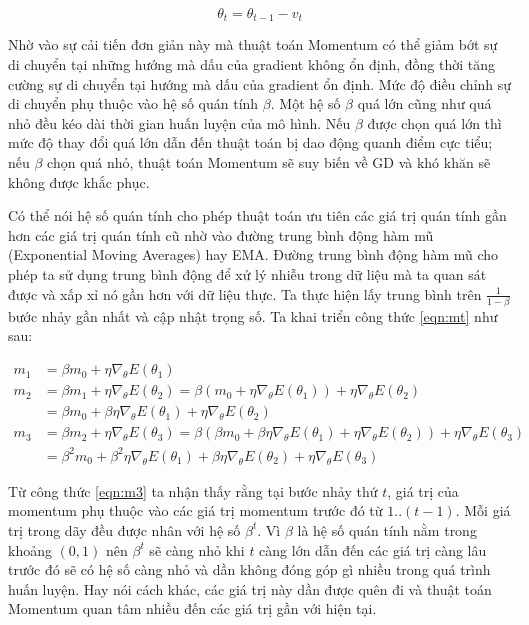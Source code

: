 \begin{equation}
	\label{eqn:theta-momentum}
	\theta_t = \theta_{t-1} - v_t
\end{equation}

Nhờ vào sự cải tiến đơn giản này mà thuật toán Momentum có thể giảm bớt sự di chuyển tại những hướng mà dấu của gradient không ổn định, đồng thời tăng cường sự di chuyển tại hướng mà dấu của gradient ổn định. Mức độ điều chỉnh sự di chuyển phụ thuộc vào hệ số quán tính $\beta$. Một hệ số $\beta$ quá lớn cũng như quá nhỏ đều kéo dài thời gian huấn luyện của mô hình. Nếu $\beta$ được chọn quá lớn thì mức độ thay đổi quá lớn dẫn đến thuật toán bị dao động quanh điểm cực tiểu; nếu $\beta$ chọn quá nhỏ, thuật toán Momentum sẽ suy biến về GD và khó khăn sẽ không được khắc phục.

Có thể nói hệ số quán tính cho phép thuật toán ưu tiên các giá trị quán tính gần hơn các giá trị quán tính cũ nhờ vào đường trung bình động hàm mũ (Exponential Moving Averages) hay EMA. Đường trung bình động hàm mũ cho phép ta sử dụng trung bình động để xử lý nhiễu trong dữ liệu mà ta quan sát được và xấp xỉ nó gần hơn với dữ liệu thực. Ta thực hiện lấy trung bình trên $\frac{1}{1-\beta}$ bước nhảy gần nhất và cập nhật trọng số. Ta khai triển công thức \ref{eqn:mt} như sau:

\begin{equation}
	\label{eqn:m3}
	\begin{aligned}
		m_1 &= \beta m_0 + \eta\nabla_\theta E(\theta_1) \\ m_2 &= \beta m_1 + \eta \nabla_\theta E(\theta_2) = \beta (m_0 + \eta\nabla_\theta E(\theta_1)) + \eta\nabla_\theta E(\theta_2) \\ &= \beta m_0 + \beta\eta\nabla_\theta E(\theta_1) + \eta\nabla_\theta E(\theta_2) \\ m_3 &= \beta m_2 + \eta\nabla_\theta E(\theta_3) = \beta (\beta m_0 + \beta\eta\nabla_\theta E(\theta_1) + \eta\nabla_\theta E(\theta_2)) + \eta\nabla_\theta E(\theta_3) \\ &= \beta^2 m_0 + \beta^2\eta \nabla_\theta E(\theta_1) + \beta \eta \nabla_\theta E(\theta_2) +\eta \nabla_\theta E(\theta_3)
	\end{aligned}
\end{equation}

Từ công thức \ref{eqn:m3} ta nhận thấy rằng tại bước nhảy thứ $t$, giá trị của momentum phụ thuộc vào các giá trị momentum trước đó từ $1..(t-1)$. Mỗi giá trị trong dãy đều được nhân với hệ số $\beta ^t$. Vì $\beta$ là hệ số quán tính nằm trong khoảng $(0,1)$ nên $\beta^t$ sẽ càng nhỏ khi $t$ càng lớn dẫn đến các giá trị càng lâu trước đó sẽ có hệ số càng nhỏ và dần không đóng góp gì nhiều trong quá trình huấn luyện. Hay nói cách khác, các giá trị này dần được quên đi và thuật toán Momentum quan tâm nhiều đến các giá trị gần với hiện tại.

